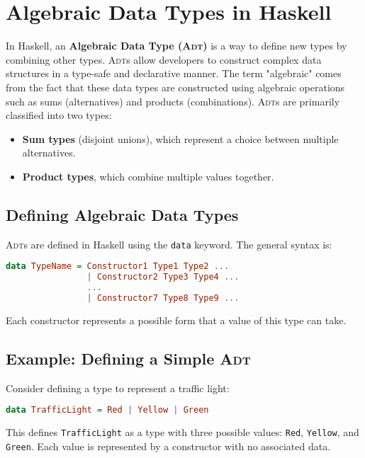 \section{Algebraic Data Types in Haskell}
In Haskell, an \textbf{Algebraic Data Type (\textsc{Adt})} is a way to define new types by combining other types. \textsc{Adt}s
allow developers to construct complex data structures in a type-safe and declarative manner. The term
"algebraic" comes from the fact that these data types are constructed using algebraic operations such as sums
(alternatives) and products (combinations). 
\textsc{Adt}s are primarily classified into two types:
\begin{itemize}
    \item \textbf{Sum types} (disjoint unions), which represent a choice between multiple alternatives.
    \item \textbf{Product types}, which combine multiple values together.
\end{itemize}

\subsection{Defining Algebraic Data Types}
\textsc{Adt}s are defined in Haskell using the \texttt{data} keyword. The general syntax is:

\begin{lstlisting}[style=haskellstyle, language=Haskell]
  data TypeName = Constructor1 Type1 Type2 ...
                | Constructor2 Type3 Type4 ...
                ...
                | Constructor7 Type8 Type9 ...
\end{lstlisting}

Each constructor represents a possible form that a value of this type can take.

\subsection{Example: Defining a Simple \textsc{Adt}}
Consider defining a type to represent a traffic light:

\begin{lstlisting}[style=haskellstyle, language=Haskell]
data TrafficLight = Red | Yellow | Green
\end{lstlisting}
This defines \texttt{TrafficLight} as a type with three possible values: \texttt{Red}, \texttt{Yellow}, and
\texttt{Green}. Each value is represented by a constructor with no associated data. 

